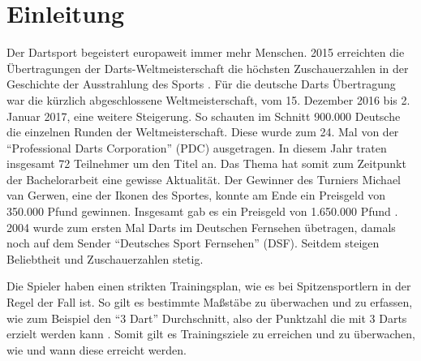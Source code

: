 
\chapter{Einleitung}
\label{chap:intro}



Der Dartsport begeistert europaweit immer mehr Menschen. 2015 erreichten die Übertragungen der Darts-Weltmeisterschaft die höchsten Zuschauerzahlen in der Geschichte der Ausstrahlung des Sports \autocite{quotenmeter2017}. Für die deutsche Darts Übertragung war die kürzlich abgeschlossene Weltmeisterschaft, vom 15. Dezember 2016 bis 2. Januar 2017, eine weitere Steigerung. So schauten im Schnitt 900.000 Deutsche die einzelnen Runden der Weltmeisterschaft. Diese wurde zum 24. Mal von der "`Professional Darts Corporation"' (PDC) ausgetragen. In diesem Jahr traten insgesamt 72 Teilnehmer um den Titel an. Das Thema hat somit zum Zeitpunkt der Bachelorarbeit eine gewisse Aktualität. 
Der Gewinner des Turniers Michael van Gerwen, eine der Ikonen des Sportes, konnte am Ende ein Preisgeld von 350.000 Pfund gewinnen. Insgesamt gab es ein Preisgeld von 1.650.000 Pfund \autocite{PDC2016}.
2004 wurde zum ersten Mal Darts im Deutschen Fernsehen übetragen, damals noch auf dem Sender "`Deutsches Sport Fernsehen"' (DSF)\autocite{GaOn2016}. Seitdem steigen Beliebtheit und Zuschauerzahlen stetig.

Die Spieler haben einen strikten Trainingsplan, wie es bei Spitzensportlern in der Regel der Fall ist. So gilt es bestimmte Maßstäbe zu überwachen und zu erfassen, wie zum Beispiel den "`3 Dart"' Durchschnitt, also der Punktzahl die mit 3 Darts erzielt werden kann \autocite[98-100]{dph2015}.
Somit gilt es Trainingsziele zu erreichen und zu überwachen, wie und wann diese erreicht werden.

